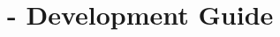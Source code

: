 \chapter{\texorpdfstring{\protect\marktool{\toolnameshort}}{\toolnameshort} - Development Guide}
\setcounter{currentlevel}{6}



\newpage





\newpage

